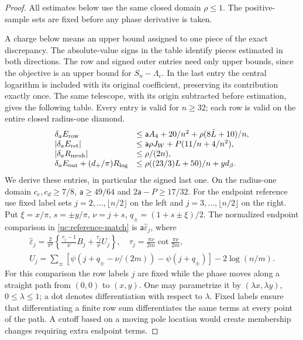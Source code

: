 \begin{proof}
All estimates below use the same closed domain $\rho\leq1$.
The positive-sample sets are fixed before any phase derivative is taken.

A charge below means an upper bound assigned to one piece of the
exact discrepancy. The absolute-value signs in the table identify
pieces estimated in both directions. The row and signed outer entries
need only upper bounds, since the objective is an upper bound for
$S_n-\Lambda_c$. In the last entry the central logarithm is included
with its original coefficient, preserving its contribution exactly once.
The same telescope, with its origin subtracted before estimation,
gives the following table. Every entry is valid for $n\geq32$;
each row is valid on the entire closed radius-one diamond.
\begin{equation}\label{uc:relative-components}
\begin{array}{ll}
\delta_aE_{\rm row}&\leq\mathsf a A_4+20/n^2+\rho(8\bar L+10)/n,\\
|\delta_aE_{\rm ret}|&\leq\mathsf a\rho J_W+P(11/n+4/n^2),\\
|\delta_aR_{\rm mesh}|&\leq\rho/(2n),\\
\delta_aE_{\rm out}+(d_+/\pi)R_{\log}
 &\leq\rho((23/3)L+50)/n+yd_\beta.
\end{array}
\end{equation}
We derive these entries, in particular the signed last one.
On the radius-one domain $c_e,c_d\geq7/8$, $\mathsf{a}\geq49/64$ and
$2\mathsf{a}-P\geq17/32$. For the endpoint reference use fixed label sets
$j=2,\ldots,\lfloor n/2\rfloor$ on the left and
$j=3,\ldots,\lfloor n/2\rfloor$ on the right. Put
$\xi=x/\pi$, $s=\pm y/\pi$, $\nu=j+s$, $q_\pm=(1+s\pm\xi)/2$.
The normalized endpoint comparison in \eqref{uc:reference-match} is
$\mathsf{a} \widehat\varepsilon_j$, where
\[
 \begin{gathered}
 \widehat\varepsilon_j=\frac2{\pi^2}\left\{\frac{\tau_j-1}{\nu}B_j
                              +\frac{\tau_j}{\nu}U_j\right\},
 \quad\tau_j=\frac{\pi\nu}{2m}\cot\frac{\pi\nu}{2m},\\
 U_j=\sum_\pm[\psi(j+q_\pm-\nu/(2m))-\psi(j+q_\pm)]
                                      -2\log(n/m).
 \end{gathered}
\]
For this comparison the row labels $j$ are fixed while the phase
moves along a straight path from $(0,0)$ to $(x,y)$. One may parametrize
it by $(\lambda x,\lambda y)$, $0\leq\lambda\leq1$; a dot denotes
differentiation with respect to $\lambda$. Fixed labels ensure that
differentiating a finite row sum differentiates the same terms at every
point of the path. A cutoff based on a moving pole location would
create membership changes requiring extra endpoint terms.


\end{proof}
